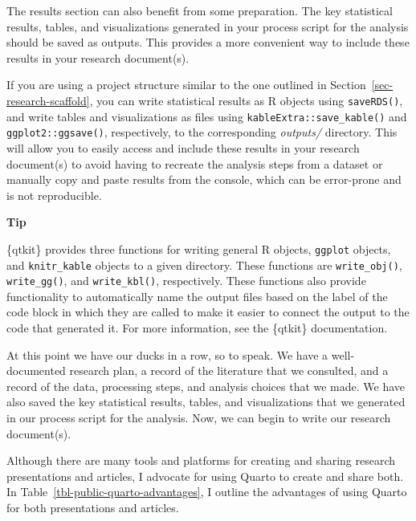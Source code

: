 \documentclass[
  letterpaper,
  krantz1]{latex/krantz-mod}
\theoremstyle{definition}
\theoremstyle{definition}
\theoremstyle{remark}
\begin{document}
The results section can also benefit from some preparation. The key
statistical results, tables, and visualizations generated in your
process script for the analysis should be saved as outputs. This
provides a more convenient way to include these results in your research
document(s).

If you are using a project structure similar to the one outlined in
Section~\ref{sec-research-scaffold}, you can
write statistical results as R objects using \texttt{saveRDS()}, and
write tables and visualizations as files using
\texttt{kableExtra::save\_kable()} and \texttt{ggplot2::ggsave()},
respectively, to the corresponding \emph{outputs/} directory. This will
allow you to easily access and include these results in your research
document(s) to avoid having to recreate the analysis steps from a
dataset or manually copy and paste results from the console, which can
be error-prone and is not reproducible.

\begin{tcolorbox}[enhanced jigsaw, toprule=.15mm, breakable, colback=white, arc=.35mm, left=2mm, colframe=quarto-callout-color-frame, opacityback=0, bottomrule=.15mm, rightrule=.15mm, leftrule=.75mm]

\textbf{ Tip}

\{qtkit\} provides three functions for writing general R objects,
\texttt{ggplot} objects, and \texttt{knitr\_kable} objects to a given
directory. These functions are \texttt{write\_obj()},
\texttt{write\_gg()}, and \texttt{write\_kbl()}, respectively. These
functions also provide functionality to automatically name the output
files based on the label of the code block in which they are called to
make it easier to connect the output to the code that generated it. For
more information, see the \{qtkit\} documentation.

\end{tcolorbox}

At this point we have our ducks in a row, so to speak. We have a
well-documented research plan, a record of the literature that we
consulted, and a record of the data, processing steps, and analysis
choices that we made. We have also saved the key statistical results,
tables, and visualizations that we generated in our process script for
the analysis. Now, we can begin to write our research document(s).

Although there are many tools and platforms for creating and sharing
research presentations and articles, I advocate for using Quarto to
create and share both. In Table~\ref{tbl-public-quarto-advantages}, I
outline the advantages of using Quarto for both presentations and
articles.
\end{document}
